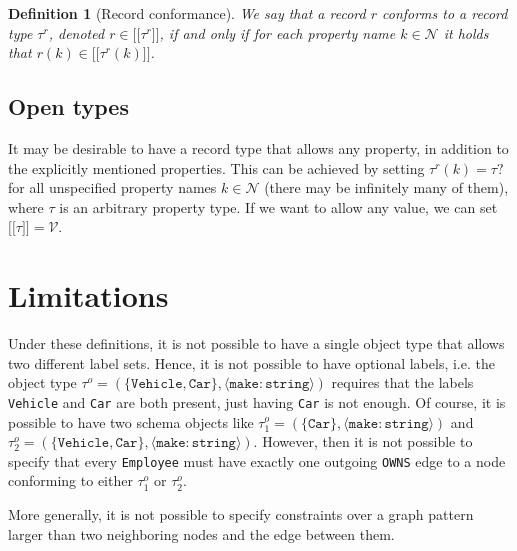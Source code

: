 \documentclass[a4paper]{article}
\newtheorem{definition}[theorem]{Definition}
\newcommand{\ptype}{\tau}
\newcommand{\rtype}{\tau^r}
\newcommand{\otype}{\tau^o}
\newcommand{\lsem}{\ensuremath{[\![}}
\newcommand{\rsem}{\ensuremath{]\!]}}
\newcommand{\sem}[1]{\ensuremath{\lsem #1 \rsem}}
\begin{document}
\begin{definition}[Record conformance]
  We say that a record $r$ \emph{conforms} to a record type $\rtype$, denoted $r \in \sem{\rtype}$, if and only if for each property name $k \in \mathcal{N}$ it holds that $r(k) \in \sem{\rtype(k)}$.
\end{definition}

\subsection{Open types}

It may be desirable to have a record type that allows any property, in addition to the explicitly mentioned properties. This can be achieved by setting $\rtype(k) = \ptype?$ for all unspecified property names $k \in \mathcal{N}$ (there may be infinitely many of them), where $\ptype$ is an arbitrary property type. If we want to allow any value, we can set $\sem{\ptype} = \mathcal{V}$.

\section{Limitations}


Under these definitions, it is not possible to have a single object type that allows two different label sets. Hence, it is not possible to have optional labels, i.e. the object type $\otype = (\{\texttt{Vehicle}, \texttt{Car}\}, \langle \texttt{make} : \texttt{string} \rangle)$ requires that the labels \texttt{Vehicle} and \texttt{Car} are both present, just having \texttt{Car} is not enough. Of course, it is possible to have two schema objects like $\otype_1 = (\{\texttt{Car}\}, \langle \texttt{make} : \texttt{string} \rangle)$ and $\otype_2 = (\{\texttt{Vehicle}, \texttt{Car}\}, \langle \texttt{make} : \texttt{string} \rangle)$. However, then it is not possible to specify that every \texttt{Employee} must have exactly one outgoing \texttt{OWNS} edge to a node conforming to either $\otype_1$ or $\otype_2$.

More generally, it is not possible to specify constraints over a graph pattern larger than two neighboring nodes and the edge between them.
\end{document}
